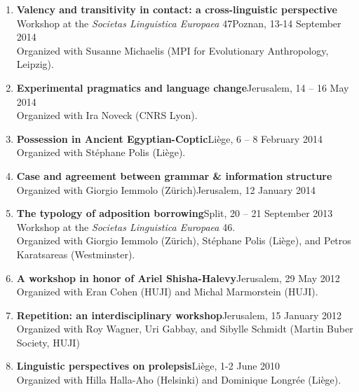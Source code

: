 \documentclass[letterpaper,11pt]{article}
\begin{document}
\begin{enumerate}
\item \textbf{Valency and transitivity in contact: a cross-linguistic perspective}\\Workshop at the \textit{Societas Linguistica Europaea} 47\hfill{Poznan, 13-14 September 2014}\\
Organized with Susanne Michaelis (MPI for Evolutionary Anthropology, Leipzig).

\item \textbf{Experimental pragmatics and language change}\hfill{Jerusalem, 14 -- 16 May 2014}\\Organized with Ira Noveck (CNRS Lyon). 

\item \textbf{Possession in Ancient Egyptian-Coptic}\hfill{Li\`{e}ge, 6 -- 8 February 2014}\\Organized with St\'{e}phane Polis (Li\`ege). 

\item \textbf{Case and agreement between grammar \& information structure}\\Organized with Giorgio Iemmolo (Z\"{u}rich)\hfill{Jerusalem, 12 January 2014}


\item \textbf{The typology of adposition borrowing}\hfill{Split, 20 -- 21 September 2013}\\Workshop at the \textit{Societas Linguistica Europaea} 46.\\ Organized with Giorgio Iemmolo (Z\"{u}rich), St\'{e}phane Polis (Li\`ege), and Petros Karatsareas (Westminster). 

\item \textbf{A workshop in honor of Ariel Shisha-Halevy}\hfill{Jerusalem, 29 May 2012}\\
Organized with Eran Cohen (HUJI) and Michal Marmorstein (HUJI).

\item \textbf{Repetition: an interdisciplinary workshop}\hfill{Jerusalem, 15 January 2012}\\
Organized with Roy Wagner, Uri Gabbay, and Sibylle Schmidt (Martin Buber Society, HUJI)

\item \textbf{Linguistic perspectives on prolepsis}\hfill{Li\`{e}ge, 1-2 June 2010}\\Organized with Hilla Halla-Aho (Helsinki) and Dominique Longrée (Li\`{e}ge). 


\end{enumerate}
\end{document}
